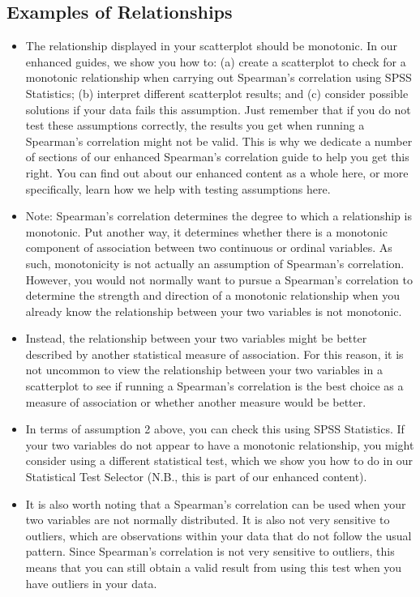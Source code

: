 \documentclass[]{article}
\begin{document}
\subsection{Examples of Relationships}
\begin{itemize}
	\item The relationship displayed in your scatterplot should be monotonic. In our enhanced guides, we show you how to: (a) create a scatterplot to check for a monotonic relationship when carrying out Spearman’s correlation using SPSS Statistics; (b) interpret different scatterplot results; and (c) consider possible solutions if your data fails this assumption. Just remember that if you do not test these assumptions correctly, the results you get when running a Spearman's correlation might not be valid. This is why we dedicate a number of sections of our enhanced Spearman's correlation guide to help you get this right. You can find out about our enhanced content as a whole here, or more specifically, learn how we help with testing assumptions here. 
	
\item Note: Spearman's correlation determines the degree to which a relationship is monotonic. Put another way, it determines whether there is a monotonic component of association between two continuous or ordinal variables. As such, monotonicity is not actually an assumption of Spearman's correlation. However, you would not normally want to pursue a Spearman's correlation to determine the strength and direction of a monotonic relationship when you already know the relationship between your two variables is not monotonic. 
\item Instead, the relationship between your two variables might be better described by another statistical measure of association. For this reason, it is not uncommon to view the relationship between your two variables in a scatterplot to see if running a Spearman's correlation is the best choice as a measure of association or whether another measure would be better.
\item In terms of assumption 2 above, you can check this using SPSS Statistics. If your two variables do not appear to have a monotonic relationship, you might consider using a different statistical test, which we show you how to do in our Statistical Test Selector (N.B., this is part of our enhanced content).
	
\item It is also worth noting that a Spearman’s correlation can be used when your two variables are not normally distributed. It is also not very sensitive to outliers, which are observations within your data that do not follow the usual pattern. Since Spearman’s correlation is not very sensitive to outliers, this means that you can still obtain a valid result from using this test when you have outliers in your data.
	
\end{itemize}
\end{document}
